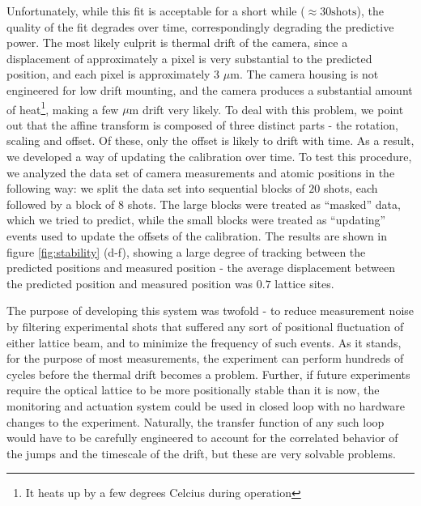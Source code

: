 \documentclass[twocolumn,aps,pra,showpacs,preprintnumbers,bibnotes]{revtex4-1}
\begin{document}
Unfortunately, while this fit is acceptable for a short while ($\approx30\mathrm{ shots}$), the quality of the fit degrades over time, correspondingly degrading the predictive power. 
The most likely culprit is thermal drift of the camera, since a displacement of approximately a pixel is very substantial to the predicted position, and each pixel is approximately 3 $\mu$m. 
The camera housing is not engineered for low drift mounting, and the camera produces a substantial amount of heat\footnote{It heats up by a few degrees Celcius during operation}, making a few $\mu$m drift very likely.
To deal with this problem, we point out that the affine transform is composed of three distinct parts - the rotation, scaling and offset. 
Of these, only the offset is likely to drift with time.
As a result, we developed a way of updating the calibration over time. To test this procedure, we analyzed the data set of camera measurements and atomic positions in the following way: we split the data set into sequential blocks of $20$ shots, each followed by a block of $8$ shots. 
The large blocks were treated as ``masked'' data, which we tried to predict, while the small blocks were treated as ``updating'' events used to update the offsets of the calibration.
The results are shown in figure \ref{fig:stability} (d-f), showing a large degree of tracking between the predicted positions and measured position - the average displacement between the predicted position and measured position was $0.7$ lattice sites. 

The purpose of developing this system was twofold - to reduce measurement noise by filtering experimental shots that suffered any sort of positional fluctuation of either lattice beam, and to minimize the frequency of such events. As it stands, for the purpose of most measurements, the experiment can perform hundreds of cycles before the thermal drift becomes a problem.
Further, if future experiments require the optical lattice to be more positionally stable than it is now, the monitoring and actuation system could be used in closed loop with no hardware changes to the experiment.
Naturally, the transfer function of any such loop would have to be carefully engineered to account for the correlated behavior of the jumps and the timescale of the drift, but these are very solvable problems.
\end{document}

